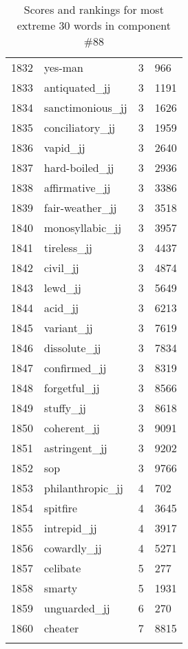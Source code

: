 \begin{longtable}[!htbp]{| rlr@{.}l |}
    1832 & yes-man & 3 & 966 \\
    1833 & antiquated\_jj & 3 & 1191 \\
    1834 & sanctimonious\_jj & 3 & 1626 \\
    1835 & conciliatory\_jj & 3 & 1959 \\
    1836 & vapid\_jj & 3 & 2640 \\
    1837 & hard-boiled\_jj & 3 & 2936 \\
    1838 & affirmative\_jj & 3 & 3386 \\
    1839 & fair-weather\_jj & 3 & 3518 \\
    1840 & monosyllabic\_jj & 3 & 3957 \\
    1841 & tireless\_jj & 3 & 4437 \\
    1842 & civil\_jj & 3 & 4874 \\
    1843 & lewd\_jj & 3 & 5649 \\
    1844 & acid\_jj & 3 & 6213 \\
    1845 & variant\_jj & 3 & 7619 \\
    1846 & dissolute\_jj & 3 & 7834 \\
    1847 & confirmed\_jj & 3 & 8319 \\
    1848 & forgetful\_jj & 3 & 8566 \\
    1849 & stuffy\_jj & 3 & 8618 \\
    1850 & coherent\_jj & 3 & 9091 \\
    1851 & astringent\_jj & 3 & 9202 \\
    1852 & sop & 3 & 9766 \\
    1853 & philanthropic\_jj & 4 & 702 \\
    1854 & spitfire & 4 & 3645 \\
    1855 & intrepid\_jj & 4 & 3917 \\
    1856 & cowardly\_jj & 4 & 5271 \\
    1857 & celibate & 5 & 277 \\
    1858 & smarty & 5 & 1931 \\
    1859 & unguarded\_jj & 6 & 270 \\
    1860 & cheater & 7 & 8815 \\
    \hline
    \caption{Scores and rankings for most extreme 30 words in component \#88} \\
\end{longtable}

